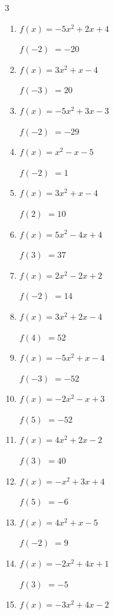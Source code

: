 \begin{multicols}{3}
\begin{enumerate}
$f(5)$
        $= -40$

\columnbreak %

\resetques

  \item $f(x)=-5x^{2}+2x+4$

$f(-2)$
        $= -20$

  \item $f(x)=3x^{2}+x-4$

$f(-3)$
        $= 20$

  \item $f(x)=-5x^{2}+3x-3$

$f(-2)$
        $= -29$

  \item $f(x)=x^{2}-x-5$

$f(-2)$
        $= 1$

  \item $f(x)=3x^{2}+x-4$

$f(2)$
        $= 10$

  \item $f(x)=5x^{2}-4x+4$

$f(3)$
        $= 37$

  \item $f(x)=2x^{2}-2x+2$

$f(-2)$
        $= 14$

  \item $f(x)=3x^{2}+2x-4$

$f(4)$
        $= 52$

  \item $f(x)=-5x^{2}+x-4$

$f(-3)$
        $= -52$

  \item $f(x)=-2x^{2}-x+3$

$f(5)$
        $= -52$

  \item $f(x)=4x^{2}+2x-2$

$f(3)$
        $= 40$

  \item $f(x)=-x^{2}+3x+4$

$f(5)$
        $= -6$

  \item $f(x)=4x^{2}+x-5$

$f(-2)$
        $= 9$

  \item $f(x)=-2x^{2}+4x+1$

$f(3)$
        $= -5$

  \item $f(x)=-3x^{2}+4x-2$


\end{enumerate}
\end{multicols}
